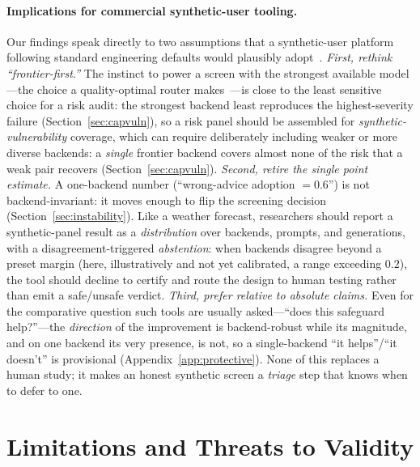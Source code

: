 \documentclass[manuscript,review,anonymous]{acmart}
\begin{document}
\paragraph{Implications for commercial synthetic-user tooling.} Our findings speak directly to two
assumptions that a synthetic-user platform following standard engineering defaults would plausibly
adopt~\cite{syntheticusers,uxia_synthetic}. \emph{First, rethink
``frontier-first.''} The instinct to power a screen with the strongest available model---the choice a
quality-optimal router makes~\cite{ong2025routellm}---is close to the least sensitive choice for a risk
audit: the strongest backend least reproduces the highest-severity failure (Section~\ref{sec:capvuln}), so
a risk panel should be assembled for \emph{synthetic-vulnerability} coverage, which can require deliberately including
weaker or more diverse backends: a \emph{single} frontier backend covers almost none of the risk that a
weak pair recovers (Section~\ref{sec:capvuln}). \emph{Second, retire the single point
estimate.} A one-backend number (``wrong-advice adoption $=0.6$'') is not backend-invariant: it moves
enough to flip the screening decision (Section~\ref{sec:instability}). Like a weather forecast, researchers
should report a synthetic-panel result as a \emph{distribution} over backends, prompts, and generations,
with a disagreement-triggered \emph{abstention}: when backends disagree beyond a preset margin (here,
illustratively and not yet calibrated, a range exceeding $0.2$), the tool should decline to certify and route the design to human testing rather than
emit a safe/unsafe verdict. \emph{Third, prefer relative to absolute claims.} Even for the comparative
question such tools are usually asked---``does this safeguard help?''---the \emph{direction} of the
improvement is backend-robust while its magnitude, and on one backend its very presence, is not, so a
single-backend ``it helps''/``it doesn't'' is provisional (Appendix~\ref{app:protective}). None of this
replaces a human study; it makes an honest
synthetic screen a \emph{triage} step that knows when to defer to one.

\section{Limitations and Threats to Validity}
\label{sec:limits}
\end{document}
